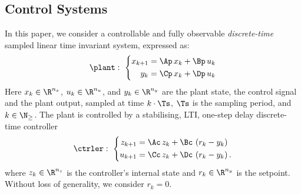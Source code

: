 \subsection{Control Systems}
\label{ssec:systemmodel}
In this paper, we consider a controllable and fully observable \emph{discrete-time} sampled linear time invariant system, expressed as:
%
\begin{equation}
    \label{eq:plant}
    \plant: \,\, \left\{
    \begin{aligned}
        x_{k+1} &= \Ap\,x_k + \Bp\,u_k \\
        y_{k} &= \Cp\,x_k + \Dp\,u_k
    \end{aligned}
    \right.
\end{equation}
%
Here $x_k\in\R^{n_x}$, $u_k\in\R^{n_u}$, and $y_k\in\R^{n_y}$ are the plant state, the control signal and the plant output, sampled at time $k\cdot \Ts$, $\Ts$ is the sampling period, and $k\in\N_{\geq}$.
The plant is controlled by a stabilising, LTI, one-step delay discrete-time controller
%
\begin{equation}
    \label{eq:controller}
    \ctrler: \,\, \left\{
    \begin{aligned}
        z_{k+1} &= \Ac\,z_k + \Bc\,\left(r_k - y_k\right) \\
        u_{k+1} &= \Cc\,z_k + \Dc\,\left(r_k - y_k\right).
    \end{aligned}
    \right.
\end{equation}
%
where $z_k\in\R^{n_z}$ is the controller's internal state and $r_k\in\R^{n_y}$ is the setpoint.
Without loss of generality, we consider $r_k = 0$.

